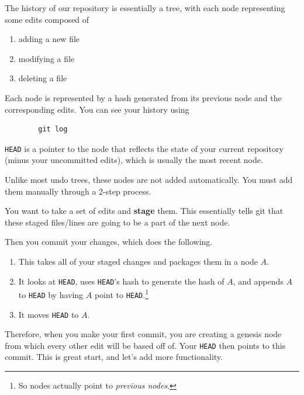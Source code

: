 \documentclass{article}
\begin{document}
    \begin{definition}
      The history of our repository is essentially a tree, with each node representing some edits composed of 
      \begin{enumerate}
        \item adding a new file 
        \item modifying a file 
        \item deleting a file
      \end{enumerate} 
      Each node is represented by a hash generated from its previous node and the corresponding edits. You can see your history using  
      \begin{lstlisting}
        git log 
      \end{lstlisting} 
      \texttt{HEAD} is a pointer to the node that reflects the state of your current repository (minus your uncommitted edits), which is usually the most recent node. 
    \end{definition} 

    Unlike most undo trees, these nodes are not added automatically. You must add them manually through a 2-step process. 

    \begin{definition}[Stage]
      You want to take a set of edits and \textbf{stage} them. This essentially tells git that these staged files/lines are going to be a part of the next node. 
    \end{definition}

    \begin{definition}[Commit]
      Then you commit your changes, which does the following. 
      \begin{enumerate}
        \item This takes all of your staged changes and packages them in a node $A$. 
        \item It looks at \texttt{HEAD}, uses \texttt{HEAD}'s hash to generate the hash of $A$, and appends $A$ to \texttt{HEAD} by having $A$ point to \texttt{HEAD}.\footnote{So nodes actually point to \textit{previous nodes}.}
        \item It moves \texttt{HEAD} to $A$. 
      \end{enumerate}
    \end{definition} 

    Therefore, when you make your first commit, you are creating a genesis node from which every other edit will be based off of. Your \texttt{HEAD} then points to this commit. This is great start, and let's add more functionality. 
\end{document}
